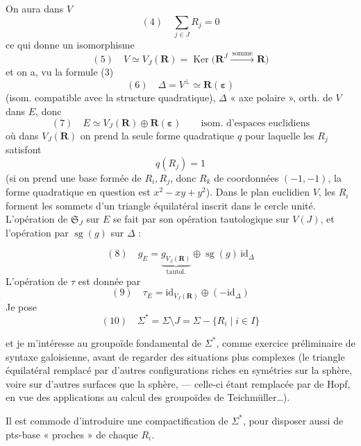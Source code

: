 \documentclass[11pt,a4paper]{article}
\begin{document}
On aura dans $V$
\[
  (4)\quad \sum_{j \in J} R_j = 0
\]
ce qui donne un isomorphisme
\[
  (5)\quad V \simeq V_J(\mathbf{R})
  = \operatorname{Ker}\big(\mathbf{R}^J \xrightarrow{\ \text{somme}\ } \mathbf{R}\big)
\]
et on a, vu la formule (3)
\[
  (6)\quad \Delta = V^{\perp} \simeq \mathbf{R}(\boldsymbol{\varepsilon})
\]
(isom. compatible avec la structure quadratique), $\Delta$ « axe polaire », orth. de $V$
dans $E$, donc
\[
  (7)\quad E \simeq V_J(\mathbf{R}) \oplus \mathbf{R}(\boldsymbol{\varepsilon})
  \qquad \text{isom. d'espaces euclidiens}
\]
où dans $V_J(\mathbf{R})$ on prend la seule forme quadratique $q$ pour laquelle les $R_j$
 satisfont
\[
  q(R_j) = 1
\]
(si \ill{} on prend une base formée de $R_i, R_j$, donc $R_k$ de coordonnées
$(-1,-1)$, la forme quadratique en question est $x^2 - xy + y^2$).
Dans le plan euclidien $V$, les $R_i$ forment les sommets d'un triangle équilatéral inscrit
dans le cercle unité. L'opération de $\mathfrak{S}_J$ sur $E$ se fait par son opération
\struck{\ill{}} tautologique sur $V(J)$, et l'opération par $\operatorname{sg}(g)$ sur
$\Delta$ :

\[
  (8)\quad g_E = \underbrace{g_{V_J(\mathbf{R})}}_{\text{tautol.}}
  \oplus \operatorname{sg}(g)\, \mathrm{id}_{\Delta}
\]
L'opération de $\tau$ est donnée par
\[
  (9)\quad \tau_E = \mathrm{id}_{V_J(\mathbf{R})} \oplus (-\mathrm{id}_{\Delta})
\]
Je pose
\[
  (10)\quad \Sigma^{*} = \Sigma \setminus J = \Sigma - \{R_i \mid i \in I\}
\]

et je m'intéresse au groupoïde fondamental de $\Sigma^{*}$, comme exercice préliminaire
de syntaxe galoisienne, avant de regarder des situations  plus complexes
(le triangle équilatéral remplacé par d'autres configurations riches en symétries sur
la sphère, voire sur d'autres surfaces que la sphère, — celle-ci étant remplacée par
 de Hopf, en vue des applications au calcul des groupoïdes de
Teichmüller…).

Il est commode d'introduire une compactification de $\Sigma^{*}$, pour disposer aussi de
pts-base « proches » de chaque $R_i$.
\end{document}
